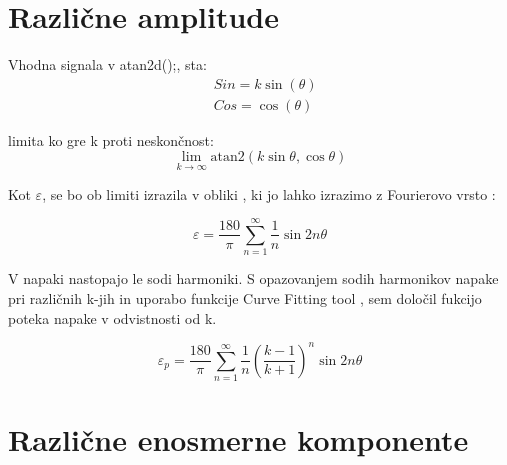 


\section{Različne amplitude}

Vhodna signala v atan2d();, sta:
\begin{eqnarray}
\label{equ:def_sin_ama}
&Sin = k \sin(\theta)\\
\label{equ:def_cos_amp}
&Cos =\cos(\theta)
\end{eqnarray}

limita ko gre k proti neskončnost:
\begin{equation}
\lim_{k \rightarrow \infty} \mathrm{atan2}(k \sin{\theta},\cos{\theta})
\end{equation}


Kot $\varepsilon$, se bo ob limiti  izrazila v obliki , ki jo lahko izrazimo z Fourierovo vrsto \cite{fourierova_vrsta}:

\begin{equation}
\varepsilon = \frac{180}{\pi}\sum_{n=1}^{\infty}\frac{1}{n} \sin 2 n \theta
\end{equation}

V napaki nastopajo le sodi harmoniki. S opazovanjem sodih harmonikov napake pri različnih k-jih in uporabo funkcije Curve Fitting tool \cite{cftool}, sem določil fukcijo poteka napake v odvistnosti od k. 

\begin{equation}
\label{vrsta_k}
\varepsilon_p =\frac{180}{\pi}\sum_{n=1}^{\infty}\frac{1}{n}(\frac{k-1}{k+1})^n \sin 2 n \theta
\end{equation}



\newpage


\section{Različne enosmerne komponente}

